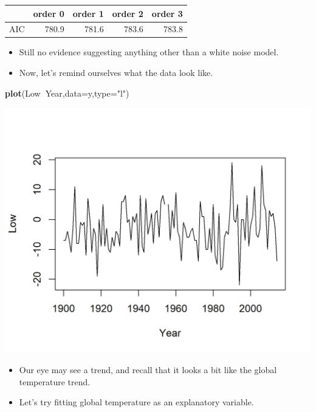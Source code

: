\documentclass[]{article}
\newenvironment{Shaded}{\begin{snugshade}}{\end{snugshade}}
\newcommand{\KeywordTok}[1]{\textcolor[rgb]{0.13,0.29,0.53}{\textbf{#1}}}
\newcommand{\DataTypeTok}[1]{\textcolor[rgb]{0.13,0.29,0.53}{#1}}
\newcommand{\StringTok}[1]{\textcolor[rgb]{0.31,0.60,0.02}{#1}}
\newcommand{\OperatorTok}[1]{\textcolor[rgb]{0.81,0.36,0.00}{\textbf{#1}}}
\newcommand{\NormalTok}[1]{#1}
\begin{document}
\begin{longtable}[]{@{}lrrrr@{}}
\toprule
& order 0 & order 1 & order 2 & order 3\tabularnewline
\midrule
\endhead
AIC & 780.9 & 781.6 & 783.6 & 783.8\tabularnewline
\bottomrule
\end{longtable}

\begin{itemize}
\item
  Still no evidence suggesting anything other than a white noise model.
\item
  Now, let's remind ourselves what the data look like.
\end{itemize}

\begin{Shaded}
\begin{Highlighting}[]
\KeywordTok{plot}\NormalTok{(Low}\OperatorTok{~}\NormalTok{Year,}\DataTypeTok{data=}\NormalTok{y,}\DataTypeTok{type=}\StringTok{"l"}\NormalTok{)}
\end{Highlighting}
\end{Shaded}

\begin{center}\includegraphics{figure/intro-plot_jan_temp-1} \end{center}

\begin{itemize}
\item
  Our eye may see a trend, and recall that it looks a bit like the
  global temperature trend.
\item
  Let's try fitting global temperature as an explanatory variable.
\end{itemize}
\end{document}
